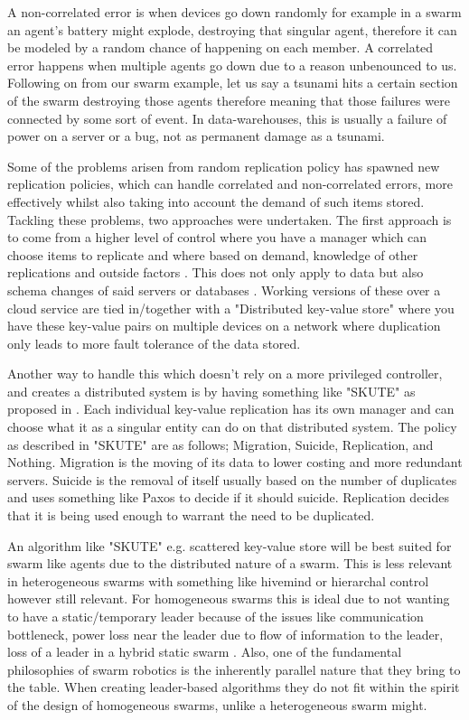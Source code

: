 \documentclass{UoYCSproject}
\begin{document}
A non-correlated error is when devices go down randomly for example in a swarm an agent's battery might explode, destroying that singular agent, therefore it can be modeled by a random chance of happening on each member. 
A correlated error happens when multiple agents go down due to a reason unbenounced to us. Following on from our swarm example, let us say a tsunami hits a certain section of the swarm destroying those agents therefore meaning that those failures were connected by some sort of event. 
In data-warehouses, this is usually a failure of power on a server or a bug, not as permanent damage as a tsunami.

Some of the problems arisen from random replication policy has spawned new replication policies, which can handle correlated and non-correlated errors, more effectively whilst also taking into account the demand of such items stored\cite{Avalability storage, Distributed Storage}.
Tackling these problems, two approaches were undertaken.
The first approach is to come from a higher level of control where you have a manager which can choose items to replicate and where based on demand, knowledge of other replications and outside factors \cite{Avalability storage, Patent}. This does not only apply to data but also schema changes of said servers or databases \cite{Scheme changes}.
Working versions of these over a cloud service are tied in/together with a "Distributed key-value store" \cite{Key-Value} where you have these key-value pairs on multiple devices on a network where duplication only leads to more fault tolerance of the data stored.

Another way to handle this which doesn't rely on a more privileged controller, and creates a distributed system is by having something like "SKUTE" as proposed in \cite{Distributed Storage}.
Each individual key-value replication has its own manager and can choose what it as a singular entity can do on that distributed system.
The policy as described in "SKUTE" are as follows; Migration, Suicide, Replication, and Nothing. Migration is the moving of its data to lower costing and more redundant servers. Suicide is the removal of itself usually based on the number of duplicates and uses something like Paxos \cite{Paxos} to decide if it should suicide. Replication decides that it is being used enough to warrant the need to be duplicated.

An algorithm like "SKUTE" e.g. scattered key-value store \cite{Distributed Storage, Quorum} will be best suited for swarm like agents due to the distributed nature of a swarm.  This is less relevant in heterogeneous swarms with something like hivemind or hierarchal control however still relevant. For homogeneous swarms this is ideal due to not wanting to have a static/temporary leader because of the issues like communication bottleneck, power loss near the leader due to flow of information to the leader, loss of a leader in a hybrid static swarm \cite{Swarm robotics reviewed, Swarm intellegiegence}.
Also, one of the fundamental philosophies of swarm robotics is the inherently parallel nature that they bring to the table. When creating leader-based algorithms they do not fit within the spirit of the design of homogeneous swarms, unlike a heterogeneous swarm might.
\end{document}
